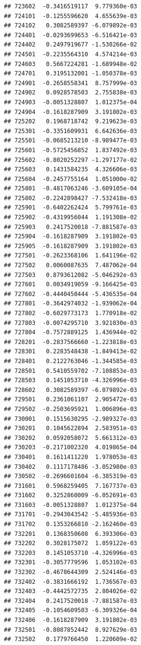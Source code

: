 \documentclass[ignorenonframetext,]{beamer}
\begin{document}
\begin{frame}[fragile]
\begin{verbatim}
## 723602  -0.3416519117  9.779360e-03
## 724101  -0.1255596620  4.655639e-03
## 724102   0.3082589397 -6.079892e-03
## 724401  -0.0293699653 -6.516421e-03
## 724402   0.2497919677 -1.530266e-02
## 724501  -0.2235564310  4.574214e-03
## 724603   0.5667224281 -1.689948e-02
## 724701   0.3195132001 -1.050378e-03
## 724901  -0.2658558341  8.757999e-03
## 724902   0.0928578503  2.755838e-03
## 724903  -0.0051328807  1.012375e-04
## 724904  -0.1618287909  3.191802e-03
## 725202   0.1968718742  9.219623e-03
## 725301  -0.3351609931  6.642636e-03
## 725501  -0.0685213210 -8.989477e-03
## 725601  -0.5725456852  1.837492e-03
## 725602  -0.8020252297 -1.297177e-02
## 725603   0.1431584235  4.326606e-03
## 725604  -0.2457755164  1.051000e-02
## 725801  -0.4817063246 -3.609105e-04
## 725802  -0.2242898427 -7.532418e-03
## 725901  -0.6402262424  5.799761e-03
## 725902  -0.4319956044  1.191308e-02
## 725903   0.2417520018 -7.881587e-03
## 725904  -0.1618287909  3.191802e-03
## 725905  -0.1618287909  3.191802e-03
## 727501  -0.2623368106  1.641196e-02
## 727502   0.0060087635  7.487062e-04
## 727503   0.8793612082 -5.046292e-03
## 727601   0.0034919059 -9.166425e-03
## 727602  -0.4440450444 -5.436535e-04
## 727801  -0.3642974032 -1.939062e-04
## 727802  -0.6029773173  1.770918e-02
## 727803  -0.0074295710  3.921030e-03
## 727804  -0.7572889125  1.436944e-02
## 728201  -0.2837566660 -1.223818e-03
## 728301   0.2283548438 -1.849413e-02
## 728401   0.2122763046 -1.344585e-03
## 728501   0.5410559702 -7.108853e-03
## 728503   0.1451053710 -4.326996e-03
## 728602   0.3082589397 -6.079892e-03
## 729501   0.2361061107  2.905472e-03
## 729502  -0.2503695921  1.006896e-03
## 730001   0.1515630295 -2.989327e-03
## 730201   0.1045622894  2.583951e-03
## 730202   0.0592058072  5.661312e-03
## 730203  -0.2171002320  4.019865e-04
## 730401   0.1611411220  1.978053e-03
## 730402   0.1117178486 -3.052980e-03
## 730502  -0.2696601604 -6.385319e-03
## 731601   0.5968259405  7.167737e-03
## 731602   0.3252860009 -6.052691e-03
## 731603  -0.0051328807  1.012375e-04
## 731701  -0.2943043542 -5.485936e-03
## 731702   0.1353266810 -2.162460e-03
## 732201   0.1368350608  6.393306e-03
## 732202   0.3028175072  1.059122e-03
## 732203   0.1451053710 -4.326996e-03
## 732301  -0.3057779596  1.053102e-03
## 732302  -0.4678644309  2.524146e-03
## 732402  -0.3831666192  1.736567e-03
## 732403  -0.4442572735  2.804026e-02
## 732404   0.2417520018 -7.881587e-03
## 732405  -0.1054609503 -6.309326e-04
## 732406  -0.1618287909  3.191802e-03
## 732501  -0.8087852442  8.927629e-03
## 732502   0.1779766450  1.220609e-02

\end{verbatim}
\end{frame}
\end{document}

